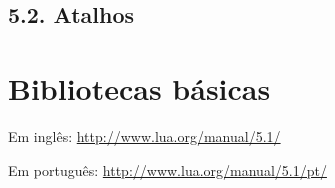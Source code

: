 \documentclass[brazil]{beamer}
\begin{document}
\subsection{5.2. Atalhos}
\section{Bibliotecas básicas}
\begin{frame}
  \vspace{15pt}
  Em inglês: \url{http://www.lua.org/manual/5.1/}

  Em português: \url{http://www.lua.org/manual/5.1/pt/}
\end{frame}
\end{document}
